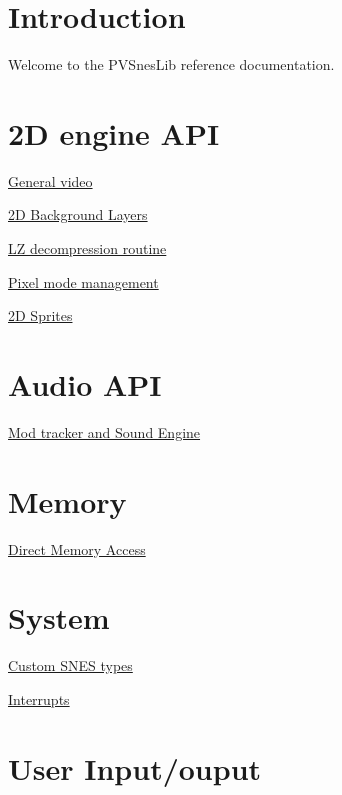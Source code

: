 \hypertarget{index_intro}{}\section{Introduction}\label{index_intro}
Welcome to the P\+V\+Snes\+Lib reference documentation.\hypertarget{index_video_2D_api}{}\section{2\+D engine A\+PI}\label{index_video_2D_api}

\begin{DoxyItemize}
\item \hyperlink{a00353}{General video}
\item \hyperlink{a00317}{2D Background Layers}
\item \hyperlink{a00332}{LZ decompression routine}
\item \hyperlink{a00338}{Pixel mode management}
\item \hyperlink{a00350}{2D Sprites}
\end{DoxyItemize}\hypertarget{index_audio_api}{}\section{Audio A\+PI}\label{index_audio_api}

\begin{DoxyItemize}
\item \hyperlink{a00347}{Mod tracker and Sound Engine}
\end{DoxyItemize}\hypertarget{index_memory_api}{}\section{Memory}\label{index_memory_api}

\begin{DoxyItemize}
\item \hyperlink{a00323}{Direct Memory Access}
\end{DoxyItemize}\hypertarget{index_system_api}{}\section{System}\label{index_system_api}

\begin{DoxyItemize}
\item \hyperlink{a00344}{Custom S\+N\+ES types}
\item \hyperlink{a00326}{Interrupts}
\end{DoxyItemize}\hypertarget{index_user_io_api}{}\section{User Input/ouput}\label{index_user_io_api}


